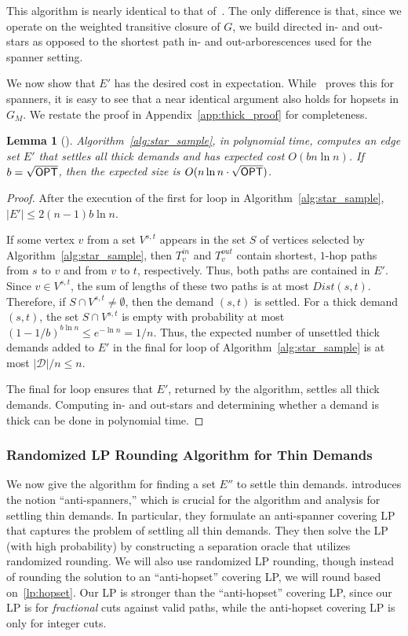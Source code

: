 \documentclass{article}
\newtheorem{lemma}[theorem]{Lemma}
\theoremstyle{definition}
\theoremstyle{remark}
\def\opt {{\sf OPT}}
\begin{document}
This algorithm is nearly identical to that of~\cite{DK11}. The only difference is that, since we operate on the weighted transitive closure of $G$, we build directed in- and out-stars as opposed to the shortest path in- and out-arborescences used for the spanner setting. 

We now show that $E'$ has the desired cost in expectation. While~\cite{DK11} proves this for spanners, it is easy to see that a near identical argument also holds for hopsets in $G_M$. We restate the proof \iflong \else in Appendix~\ref{app:thick_proof} \fi for completeness.

\begin{lemma}[\hspace{1sp}\cite{DK11}] \label{lem:thick}
    Algorithm~\ref{alg:star_sample}, in polynomial time, computes an edge set $E'$ that settles all thick demands and has expected cost $O(bn\ln{n} )$. If $b = \sqrt{{\opt}}$, then the expected size is $O(n\ln{n} \cdot \sqrt{{\opt}})$.
\end{lemma}
\iflong
\begin{proof}  
    After the execution of the first for loop in Algorithm~\ref{alg:star_sample}, $|E'| \leq 2(n-1)b \ln{n}$.

    If some vertex $v$ from a set $V^{s,t}$ appears in the set $S$ of vertices selected by Algorithm~\ref{alg:star_sample}, then $T^{in}_v$ and $T^{out}_v$ contain shortest, $1$-hop paths from $s$ to $v$ and from $v$ to $t$, respectively. Thus, both paths are contained in $E'$. Since $v \in V^{s,t}$, the sum of lengths of these two paths is at most $Dist(s,t)$. Therefore, if $S \cap V^{s,t} \neq \emptyset$, then the demand $(s,t)$ is settled. For a thick demand $(s,t)$, the set $S \cap V^{s,t}$ is empty with probability at most $(1-1/b)^{b\ln{n}} \leq e^{-\ln{n}} = 1/n$. Thus, the expected number of unsettled thick demands added to $E'$ in the final for loop of Algorithm~\ref{alg:star_sample} is at most $|\mathcal{D}|/n \leq n$.

    The final for loop ensures that $E'$, returned by the algorithm, settles all thick demands. Computing in- and out-stars and determining whether a demand is thick can be done in polynomial time.
\end{proof}
\else
\fi


\subsubsection{Randomized LP Rounding Algorithm for Thin Demands} 
We now give the algorithm for finding a set $E''$ to settle thin demands. \cite{BBMRY11} introduces the notion ``anti-spanners,'' which is crucial for the algorithm and analysis for settling thin demands. In particular, they formulate an anti-spanner covering LP that captures the problem of settling all thin demands. They then solve the LP (with high probability) by constructing a separation oracle that utilizes randomized rounding. We will also use randomized LP rounding, though instead of rounding the solution to an ``anti-hopset'' covering LP, we will round based on~\ref{lp:hopset}.  Our LP is stronger than the ``anti-hopset'' covering LP, since our LP is for \textit{fractional} cuts against valid paths, while the anti-hopset covering LP is only for integer cuts.
\end{document}
